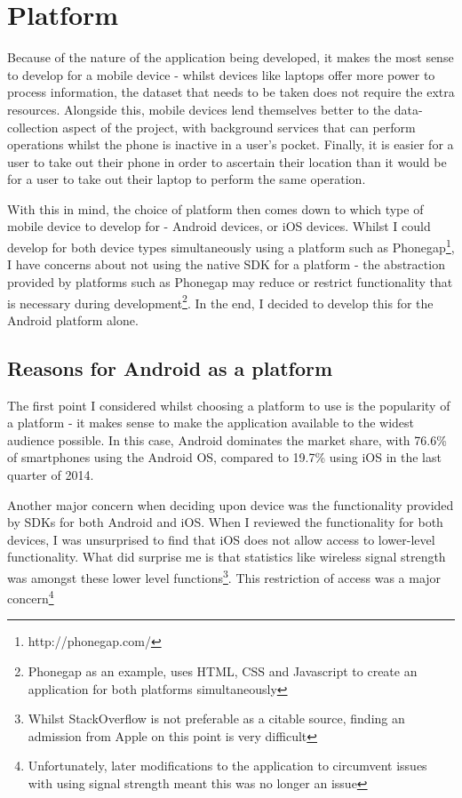 \documentclass[11pt]{informatics-report}
\begin{document}
\section{Platform}

Because of the nature of the application being developed, it makes the most sense to develop for a mobile device - whilst devices like laptops offer more power to process information, the dataset that needs to be taken does not require the extra resources. Alongside this, mobile devices lend themselves better to the data-collection aspect of the project, with background services that can perform operations whilst the phone is inactive in a user's pocket. Finally, it is easier for a user to take out their phone in order to ascertain their location than it would be for a user to take out their laptop to perform the same operation.

With this in mind, the choice of platform then comes down to which type of mobile device to develop for - Android devices, or iOS devices. Whilst I could develop for both device types simultaneously using a platform such as Phonegap\footnote{http://phonegap.com/}, I have concerns about not using the native SDK for a platform - the abstraction provided by platforms such as Phonegap may reduce or restrict functionality that is necessary during development\footnote{Phonegap as an example, uses HTML, CSS and Javascript to create an application for both platforms simultaneously}. In the end, I decided to develop this for the Android platform alone.

\subsection{Reasons for Android as a platform}

The first point I considered whilst choosing a platform to use is the popularity of a platform - it makes sense to make the application available to the widest audience possible. In this case, Android dominates the market share, with 76.6\% of smartphones using the Android OS, compared to 19.7\% using iOS in the last quarter of 2014\cite{devicestats}.

Another major concern when deciding upon device was the functionality provided by SDKs for both Android and iOS. When I reviewed the functionality for both devices, I was unsurprised to find that iOS does not allow access to lower-level functionality. What did surprise me is that statistics like wireless signal strength was amongst these lower level functions\cite{ios1}\cite{ios2}\footnote{Whilst StackOverflow is not preferable as a citable source, finding an admission from Apple on this point is very difficult}. This restriction of access was a major concern\footnote{Unfortunately, later modifications to the application to circumvent issues with using signal strength meant this was no longer an issue}
\end{document}
